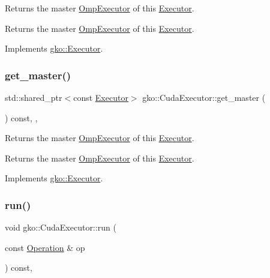 Returns the master \hyperlink{classgko_1_1OmpExecutor}{Omp\+Executor} of this \hyperlink{classgko_1_1Executor}{Executor}. 

\begin{DoxyReturn}{Returns}
the master \hyperlink{classgko_1_1OmpExecutor}{Omp\+Executor} of this \hyperlink{classgko_1_1Executor}{Executor}. 
\end{DoxyReturn}


Implements \hyperlink{classgko_1_1Executor_acaec4f999d52fc71e5e5a3d3ad93609c}{gko\+::\+Executor}.

\mbox{\label{classgko_1_1CudaExecutor_a75295b3424224f907958abfa95c66298}} 
\subsubsection{\texorpdfstring{get\+\_\+master()}{get\_master()}\hspace{0.1cm}{\footnotesize\ttfamily [2/2]}}
{\footnotesize\ttfamily std\+::shared\+\_\+ptr$<$const \hyperlink{classgko_1_1Executor}{Executor}$>$ gko\+::\+Cuda\+Executor\+::get\+\_\+master (\begin{DoxyParamCaption}{ }\end{DoxyParamCaption}) const\hspace{0.3cm}{\ttfamily [override]}, {\ttfamily [virtual]}, {\ttfamily [noexcept]}}



Returns the master \hyperlink{classgko_1_1OmpExecutor}{Omp\+Executor} of this \hyperlink{classgko_1_1Executor}{Executor}. 

\begin{DoxyReturn}{Returns}
the master \hyperlink{classgko_1_1OmpExecutor}{Omp\+Executor} of this \hyperlink{classgko_1_1Executor}{Executor}. 
\end{DoxyReturn}


Implements \hyperlink{classgko_1_1Executor_a261386e439c8daa6e0d95dc331b9bfeb}{gko\+::\+Executor}.

\mbox{\label{classgko_1_1CudaExecutor_a32a73a74403376d774933abf9663d59e}} 
\subsubsection{\texorpdfstring{run()}{run()}}
{\footnotesize\ttfamily void gko\+::\+Cuda\+Executor\+::run (\begin{DoxyParamCaption}\item[{const \hyperlink{classgko_1_1Operation}{Operation} \&}]{op }\end{DoxyParamCaption}) const\hspace{0.3cm}{\ttfamily [override]}, {\ttfamily [virtual]}}



